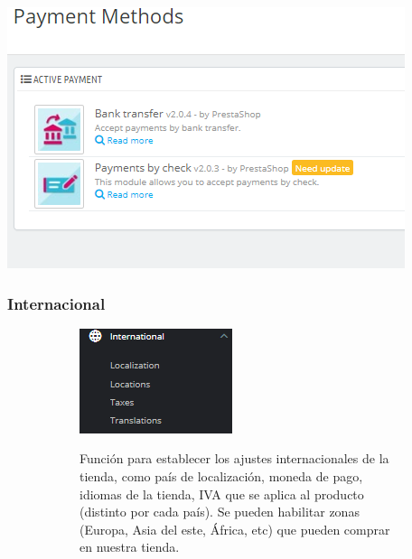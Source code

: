 \documentclass{article}
\begin{document}
\begin{center}
\includegraphics[scale=0.6]{images/payment.png}
\end{center}

\subsubsection{Internacional}

\begin{figure}[h!]
        \raggedright
        \begin{subfigure}[!]{0.4\textwidth} 
            \includegraphics[width=\textwidth]{images/inter.png}
        \end{subfigure}       
        \begin{subfigure}[!]{0.4\textwidth} 
            Función para establecer los ajustes internacionales de la tienda, como país de localización, moneda de pago, idiomas de la tienda, IVA que se aplica al producto (distinto por cada país). Se pueden habilitar zonas (Europa, Asia del este, África, etc) que pueden comprar en nuestra tienda.
        \end{subfigure}
    \end{figure}
    
\end{document}
